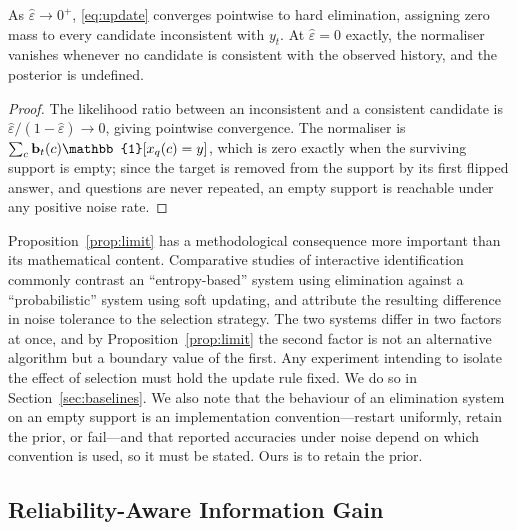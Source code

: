 \begin{proposition}
\label{prop:limit}
As $\hat\varepsilon \to 0^{+}$, \eqref{eq:update} converges pointwise to hard
elimination, assigning zero mass to every candidate inconsistent with $y_t$.
At $\hat\varepsilon = 0$ exactly, the normaliser vanishes whenever no candidate
is consistent with the observed history, and the posterior is undefined.
\end{proposition}

\begin{proof}
The likelihood ratio between an inconsistent and a consistent candidate is
$\hat\varepsilon/(1-\hat\varepsilon) \to 0$, giving pointwise convergence. The
normaliser is $\sum_c \bb_t(c)\mathbb{1}[x_q(c)=y]$, which is zero exactly when
the surviving support is empty; since the target is removed from the support by
its first flipped answer, and questions are never repeated, an empty support is
reachable under any positive noise rate.
\end{proof}

Proposition~\ref{prop:limit} has a methodological consequence more important
than its mathematical content. Comparative studies of interactive
identification commonly contrast an ``entropy-based'' system using elimination
against a ``probabilistic'' system using soft updating, and attribute the
resulting difference in noise tolerance to the selection strategy. The two
systems differ in two factors at once, and by Proposition~\ref{prop:limit} the
second factor is not an alternative algorithm but a boundary value of the
first. Any experiment intending to isolate the effect of selection must hold
the update rule fixed. We do so in Section~\ref{sec:baselines}. We also note
that the behaviour of an elimination system on an empty support is an
implementation convention---restart uniformly, retain the prior, or fail---and
that reported accuracies under noise depend on which convention is used, so it
must be stated. Ours is to retain the prior.

\subsection{Reliability-Aware Information Gain}

